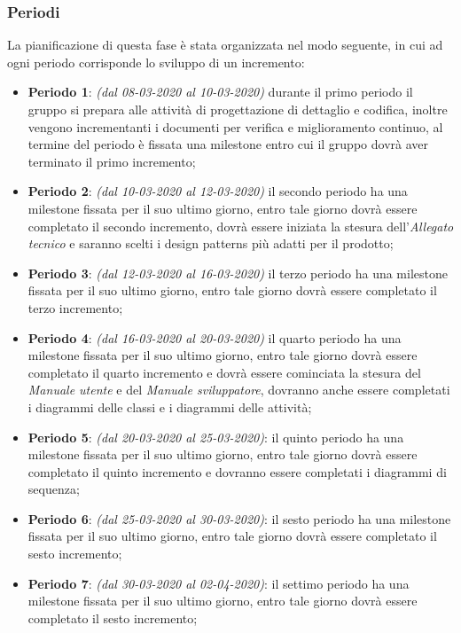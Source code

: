 \subsubsection{Periodi}
La pianificazione di questa fase è stata organizzata nel modo seguente, in cui ad ogni periodo corrisponde lo sviluppo di un incremento:
\begin{itemize}
\item \textbf{Periodo 1}: \textit{(dal 08-03-2020 al 10-03-2020)} durante il primo periodo il gruppo si prepara alle attività di progettazione di dettaglio e codifica, inoltre vengono incrementanti i documenti per verifica e miglioramento continuo, al termine del periodo è fissata una milestone entro cui il gruppo dovrà aver terminato il primo incremento;

\item \textbf{Periodo 2}: \textit{(dal 10-03-2020 al 12-03-2020)} il secondo periodo ha una milestone fissata per il suo ultimo giorno, entro tale giorno dovrà essere completato il secondo incremento, dovrà essere iniziata la stesura dell'\textit{Allegato tecnico} e saranno scelti i design patterns più adatti per il prodotto;

\item \textbf{Periodo 3}: \textit{(dal 12-03-2020 al 16-03-2020)} il terzo periodo ha una milestone fissata per il suo ultimo giorno, entro tale giorno dovrà essere completato il terzo incremento;

\item \textbf{Periodo 4}: \textit{(dal 16-03-2020 al 20-03-2020)} il quarto periodo ha una milestone fissata per il suo ultimo giorno, entro tale giorno dovrà essere completato il quarto incremento e dovrà essere cominciata la stesura del \textit{Manuale utente} e del \textit{Manuale sviluppatore}, dovranno anche essere completati i diagrammi delle classi e i diagrammi delle attività;

\item \textbf{Periodo 5}: \textit{(dal 20-03-2020 al 25-03-2020)}: il quinto periodo ha una milestone fissata per il suo ultimo giorno, entro tale giorno dovrà essere completato il quinto incremento e dovranno essere completati i diagrammi di sequenza;

\item \textbf{Periodo 6}: \textit{(dal 25-03-2020 al 30-03-2020)}: il sesto periodo ha una milestone fissata per il suo ultimo giorno, entro tale giorno dovrà essere completato il sesto incremento;

\item \textbf{Periodo 7}: \textit{(dal 30-03-2020 al 02-04-2020)}: il settimo periodo ha una milestone fissata per il suo ultimo giorno, entro tale giorno dovrà essere completato il sesto incremento;

\end{itemize}

